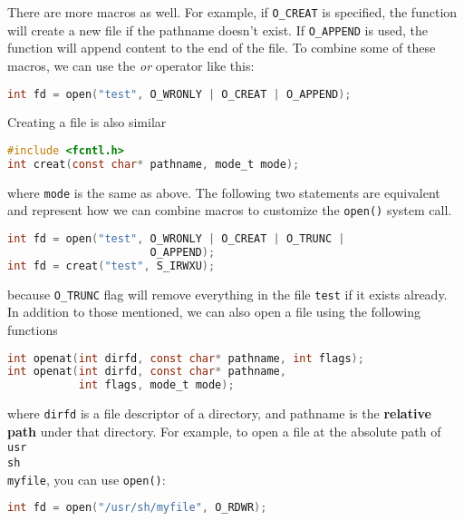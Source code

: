 \documentclass{article}
\newcommand{\bold}[1]{\textbf{#1}}
\newcommand{\code}[1]{\texttt{#1}}
\begin{document}
\noindent There are more macros as well. For example, if \code{O\_CREAT} is specified, the function will create a new file if the pathname doesn't exist. If \code{O\_APPEND} is used, the function will append content to the end of the file. To combine some of these macros, we can use the \emph{or} operator like this:

\begin{lstlisting}[language=C]
int fd = open("test", O_WRONLY | O_CREAT | O_APPEND);
\end{lstlisting}

\noindent Creating a file is also similar 

\begin{lstlisting}[language=C]
#include <fcntl.h>
int creat(const char* pathname, mode_t mode);
\end{lstlisting}

\noindent where \code{mode} is the same as above. The following two statements are equivalent and represent how we can combine macros to customize the \code{open()} system call. 

\begin{lstlisting}[language=C]
int fd = open("test", O_WRONLY | O_CREAT | O_TRUNC |
                      O_APPEND);
int fd = creat("test", S_IRWXU);
\end{lstlisting}

\noindent because \code{O\_TRUNC} flag will remove everything in the file \code{test} if it exists already. \\ 

\noindent In addition to those mentioned, we can also open a file using the following functions 

\begin{lstlisting}[language=C]
int openat(int dirfd, const char* pathname, int flags);
int openat(int dirfd, const char* pathname, 
           int flags, mode_t mode);
\end{lstlisting}

\noindent where \code{dirfd} is a file descriptor of a directory, and pathname is the \bold{relative path} under that directory. For example, to open a file at the absolute path of \code{\\usr\\sh\\myfile}, you can use \code{open()}:

\begin{lstlisting}[language=C]
int fd = open("/usr/sh/myfile", O_RDWR);
\end{lstlisting}
\end{document}

